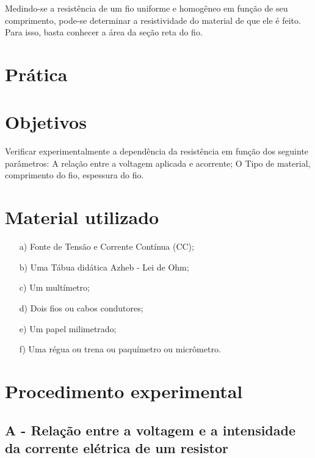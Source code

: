 \noindent Medindo-se a resistência de um fio uniforme e homogêneo em função de seu comprimento, pode-se determinar a resistividade do material de que ele é feito. Para isso, basta conhecer a área da seção reta do fio.


\section*{Prática}
	\section{Objetivos}
	
	Verificar experimentalmente a dependência da resistência em função dos seguinte parâmetros: A relação entre a voltagem aplicada  e acorrente; O Tipo de material, comprimento do fio, espessura do fio. 
	\section{Material utilizado}
	
	\begin{itemize}
		\item[a)] Fonte de Tensão e Corrente Contínua (CC);
		\item[b)] Uma Tábua didática Azheb - Lei de Ohm;
		\item[c)] Um multímetro;
		\item[d)] Dois fios ou cabos condutores;
		\item[e)] Um papel milimetrado;
		\item[f)] Uma régua ou trena ou paquímetro ou micrômetro.
		
	\end{itemize}

	\section{Procedimento experimental}
	
	\subsection{A - Relação entre a voltagem e a intensidade da corrente elétrica de um resistor}

